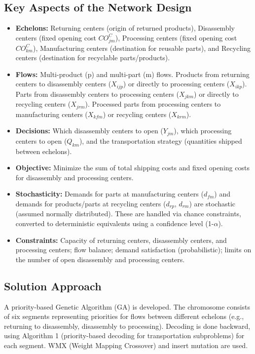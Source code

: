 \subsection*{Key Aspects of the Network Design}
\begin{itemize}
    \item \textbf{Echelons:} Returning centers (origin of returned products), Disassembly centers (fixed opening cost $CO_{jm}^{C}$), Processing centers (fixed opening cost $CO_{km}^{C}$), Manufacturing centers (destination for reusable parts), and Recycling centers (destination for recyclable parts/products).
    \item \textbf{Flows:} Multi-product (p) and multi-part (m) flows. Products from returning centers to disassembly centers ($X_{ijp}$) or directly to processing centers ($X_{ikp}$). Parts from disassembly centers to processing centers ($X_{jkm}$) or directly to recycling centers ($X_{jrm}$). Processed parts from processing centers to manufacturing centers ($X_{kfm}$) or recycling centers ($X_{krm}$).
    \item \textbf{Decisions:} Which disassembly centers to open ($Y_{jm}$), which processing centers to open ($Q_{km}$), and the transportation strategy (quantities shipped between echelons).
    \item \textbf{Objective:} Minimize the sum of total shipping costs and fixed opening costs for disassembly and processing centers.
    \item \textbf{Stochasticity:} Demands for parts at manufacturing centers ($d_{fm}$) and demands for products/parts at recycling centers ($d_{rp}$, $d_{rm}$) are stochastic (assumed normally distributed). These are handled via chance constraints, converted to deterministic equivalents using a confidence level (1-$\alpha$).
    \item \textbf{Constraints:} Capacity of returning centers, disassembly centers, and processing centers; flow balance; demand satisfaction (probabilistic); limits on the number of open disassembly and processing centers.
\end{itemize}

\subsection*{Solution Approach}
A priority-based Genetic Algorithm (GA) is developed. The chromosome consists of six segments representing priorities for flows between different echelons (e.g., returning to disassembly, disassembly to processing). Decoding is done backward, using Algorithm 1 (priority-based decoding for transportation subproblems) for each segment. WMX (Weight Mapping Crossover) and insert mutation are used.

